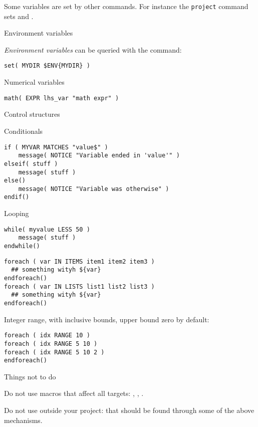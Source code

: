 Some variables are set by other commands.
For instance the \texttt{project} command sets
 and .

 {Environment variables}

\emph{Environment variables}
can be queried with the  command:
\begin{lstlisting}
set( MYDIR $ENV{MYDIR} )
\end{lstlisting}

 {Numerical variables}

\begin{lstlisting}
math( EXPR lhs_var "math expr" )
\end{lstlisting}

 {Control structures}

 {Conditionals}

\begin{lstlisting}
if ( MYVAR MATCHES "value$" )
    message( NOTICE "Variable ended in 'value'" )
elseif( stuff )
    message( stuff )
else()
    message( NOTICE "Variable was otherwise" )
endif()
\end{lstlisting}

 {Looping}

\begin{lstlisting}
while( myvalue LESS 50 )
    message( stuff )
endwhile()
\end{lstlisting}

\begin{lstlisting}
foreach ( var IN ITEMS item1 item2 item3 )
  ## something wityh ${var}
endforeach()
foreach ( var IN LISTS list1 list2 list3 )
  ## something wityh ${var}
endforeach()
\end{lstlisting}

Integer range, with inclusive bounds, upper bound zero by default:
\begin{lstlisting}
foreach ( idx RANGE 10 )
foreach ( idx RANGE 5 10 )
foreach ( idx RANGE 5 10 2 )
endforeach()
\end{lstlisting}

 {Things not to do}

Do not use macros that affect all targets: ,
, .

Do not use  outside your project:
that should be found through some of the above mechanisms.



